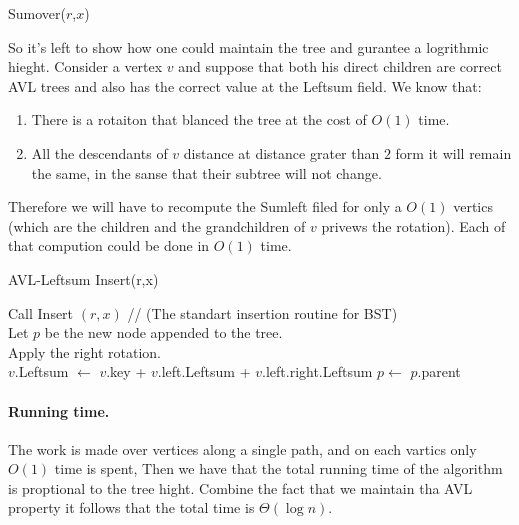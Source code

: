 \begin{algbox}{Sumover($r$,$x$)}
  \begin{algorithm}[H]
  \end{algorithm}
\end{algbox}

So it's left to show how one could maintain the tree and gurantee a logrithmic hieght. Consider a vertex $v$ and suppose that both
his direct children are correct AVL trees and also has the correct value at the Leftsum field. We know that:
\begin{enumerate}
  \item There is a rotaiton that blanced the tree at the cost of $O(1)$ time.
  \item All the descendants of $v$ distance at distance grater than $2$ form it will remain the same, in the sanse that 
    their subtree will not change. 
\end{enumerate}
Therefore we will have to recompute the Sumleft filed for only a $O(1)$ vertics (which are the children and the grandchildren of $v$ privews the rotation). 
Each of that compution could be done in $O(1)$ time. 


\begin{algbox}{AVL-Leftsum Insert(r,x)}
  \begin{algorithm}[H]
    Call Insert $(r,x)$ // (The standart insertion routine for BST) \\  
    Let $p$ be the new node appended to the tree. \\
     {
      Apply the right rotation. \\
       {
	$v$.Leftsum $\leftarrow$ $v$.key + $v$.left.Leftsum + $v$.left.right.Leftsum 		
      }
      $p \leftarrow$ $p$.parent \\  
    }
  \end{algorithm}
\end{algbox}

\paragraph{Running time.} The work is made over vertices along a single path, and on each vartics only $O(1)$ time 
is spent, Then we have that the total running time of the algorithm is proptional to the tree hight. 
Combine the fact that we maintain tha AVL property it follows that the total time is $\Theta\left( \log n \right)$.  




